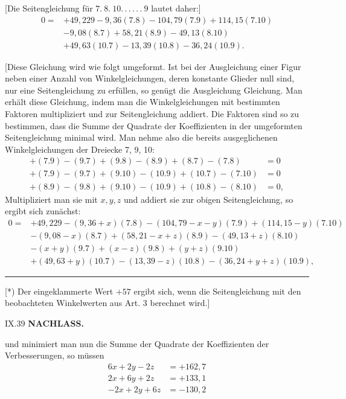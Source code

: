 [Die Seitengleichung für $7.\ 8.\ 10.\,.\,.\,.\,.\,.\ 9$ lautet daher:]
\[
\begin{aligned}
0={}&+49{,}229-9{,}36(7.8)-104{,}79(7.9)+114{,}15(7.10)\\
&-9{,}08(8.7)+58{,}21(8.9)-49{,}13(8.10)\\
&+49{,}63(10.7)-13{,}39(10.8)-36{,}24(10.9).
\end{aligned}
\]

[Diese Gleichung wird wie folgt umgeformt. Ist bei der Ausgleichung
einer Figur neben einer Anzahl von Winkelgleichungen, deren konstante Glieder
null sind, nur eine Seitengleichung zu erfüllen, so genügt die Ausgleichung
 Gleichung. Man erhält diese Gleichung, indem man
die Winkelgleichungen mit bestimmten Faktoren multipliziert
und zur Seitengleichung addiert. Die Faktoren sind so zu bestimmen,
dass die Summe der Quadrate der Koeffizienten in der umgeformten
Seitengleichung minimal wird. Man nehme also die bereits ausgeglichenen
Winkelgleichungen der Dreiecke 7, 9, 10:
\[
\begin{aligned}
+(7.9)-(9.7)+(9.8)-(8.9)+(8.7)-(7.8)&=0\\
+(7.9)-(9.7)+(9.10)-(10.9)+(10.7)-(7.10)&=0\\
+(8.9)-(9.8)+(9.10)-(10.9)+(10.8)-(8.10)&=0,
\end{aligned}
\]
Multipliziert man sie mit $x,y,z$ und addiert sie zur obigen Seitengleichung,
so ergibt sich zunächst:
\[
\begin{aligned}
0={}&+49{,}229-(9{,}36+x)(7.8)-(104{,}79-x-y)(7.9)+(114{,}15-y)(7.10)\\
&-(9{,}08-x)(8.7)+(58{,}21-x+z)(8.9)-(49{,}13+z)(8.10)\\
&-(x+y)(9.7)+(x-z)(9.8)+(y+z)(9.10)\\
&+(49{,}63+y)(10.7)-(13{,}39-z)(10.8)-(36{,}24+y+z)(10.9),
\end{aligned}
\]
\par\smallskip
\noindent\rule{0.25\textwidth}{0.4pt}\par
{\footnotesize
[*) Der eingeklammerte Wert $+57$ ergibt sich, wenn die Seitengleichung mit den beobachteten
Winkelwerten aus Art. 3 berechnet wird.]\par}
\vfill
\noindent\textsc{IX.}\hfill39
\newpage
{}\hfill\textbf{NACHLASS.}\par\medskip
\noindent und minimiert man nun die Summe der Quadrate der Koeffizienten
der Verbesserungen, so müssen
\[
\begin{aligned}
6x+2y-2z&=+162{,}7\\
2x+6y+2z&=+133{,}1\\
-2x+2y+6z&=-130{,}2
\end{aligned}
\]

